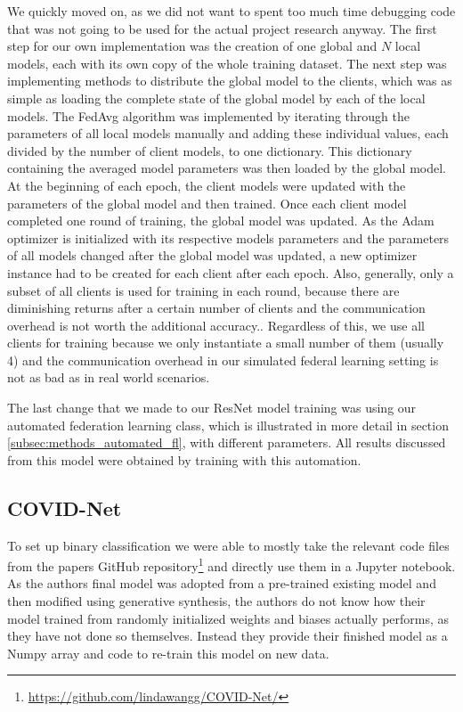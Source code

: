 We quickly moved on, as we did not want to spent too much time debugging code that was not going to be used for the actual project research anyway. The first step for our own implementation was the creation of one global and $N$ local models, each with its own copy of the whole training dataset.
The next step was implementing methods to distribute the global model to the clients, which was as simple as loading the complete state of the global model by each of the local models. The FedAvg algorithm was implemented by iterating through the parameters of all local models manually and adding these individual values, each divided by the number of client models, to one dictionary. This dictionary containing the averaged model parameters was then loaded by the global model.
At the beginning of each epoch, the client models were updated with the parameters of the global model and then trained. Once each client model completed one round of training, the global model was updated.
As the Adam optimizer is initialized with its respective models parameters and the parameters of all models changed after the global model was updated, a new optimizer instance had to be created for each client after each epoch.
Also, generally, only a subset of all clients is used for training in each round, because there are diminishing returns after a certain number of clients and the communication overhead is not worth the additional accuracy.\cite{fl_paper}. Regardless of this, we use all clients for training because we only instantiate a small number of them (usually 4) and the communication overhead in our simulated federal learning setting is not as bad as in real world scenarios.

The last change that we made to our ResNet model training was using our automated federation learning class, which is illustrated in more detail in section \ref{subsec:methods_automated_fl}, with different parameters. All results discussed from this model were obtained by training with this automation.

\subsection{COVID-Net}\label{subsec:dev_covidnet}
To set up binary classification we were able to mostly take the relevant code files from the papers GitHub repository\footnote{\url{https://github.com/lindawangg/COVID-Net/}} and directly use them in a Jupyter notebook. As the authors final model was adopted from a pre-trained existing model and then modified using generative synthesis, the authors do not know how their model trained from randomly initialized weights and biases actually performs, as they have not done so themselves. Instead they provide their finished model as a Numpy array and code to re-train this model on new data. 

